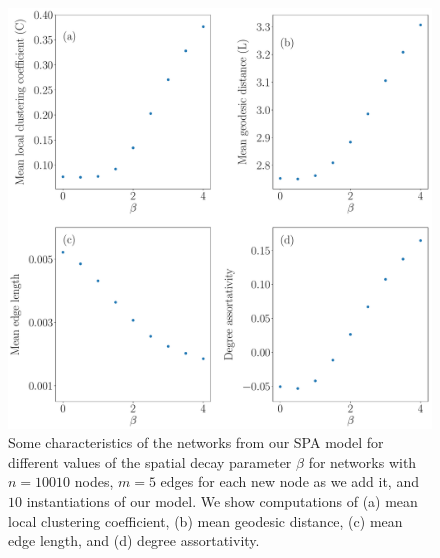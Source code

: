 \documentclass[%
 reprint,
 amsmath,amssymb,
 aps,
]{revtex4-1}
\begin{document}
\begin{figure}
    \centering
    \includegraphics[width=1.0\linewidth]{preferential_attachment_metrics.pdf}
    \caption{Some characteristics of the networks from our SPA model for different values of the spatial decay parameter $\beta$ for networks with $n=10010$ nodes, $m=5$ edges for each new node as we add it, and $10$ instantiations of our model. We show computations of (a) mean local clustering coefficient, (b) mean geodesic distance, (c) mean edge length, and (d) degree assortativity.
    }
\end{figure}
\end{document}
